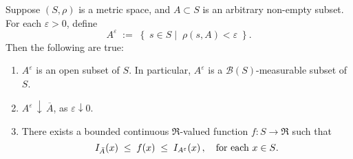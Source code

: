 \begin{lemma}
\label{LemmaAEpsilon}
\quad
Suppose $\left(S,\rho\right)$ is a metric space, and $A \subset S$ is an arbitrary non-empty subset.
For each $\varepsilon > 0$, define
\begin{equation*}
A^{\varepsilon} \;:=\;
\left\{\;
s \in S
\;\left\vert\;\;
\rho(s,A) < \varepsilon
\right.
\;\right\}.
\end{equation*}
Then the following are true:
\begin{enumerate}
\item
	$A^{\varepsilon}$ is an open subset of $S$. In particular, $A^{\varepsilon}$ is a $\mathcal{B}(S)$-measurable subset of $S$.
\item
	$A^{\varepsilon}\,\downarrow\,\overline{A}$, as $\varepsilon \downarrow 0$.
\item
	There exists a bounded continuous $\Re$-valued function $f : S \longrightarrow \Re$
	such that
	\begin{equation*}
	I_{\bar{A}}(x) \;\leq\; f(x) \;\leq\; I_{A^{\varepsilon}}(x)\,,
	\quad\textnormal{for each $x \in S$}.
	\end{equation*}
\end{enumerate}	
\end{lemma}
\proof
